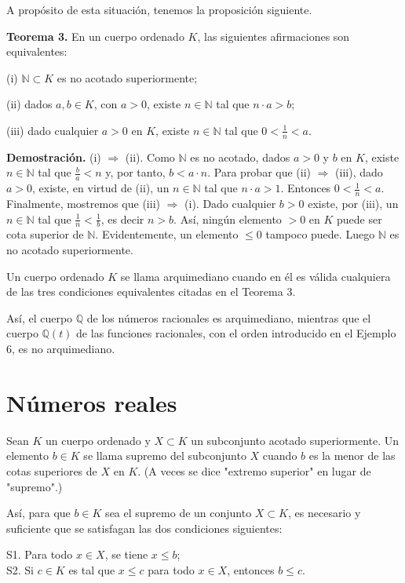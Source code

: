 \documentclass[12pt,oneside]{book}
\begin{document}
A propósito de esta situación, tenemos la proposición siguiente.

\textbf{Teorema 3.} En un cuerpo ordenado \(K\), las siguientes afirmaciones son equivalentes:

(i) \(\mathbb{N} \subset K\) es no acotado superiormente;

(ii) dados \(a, b \in K\), con \(a > 0\), existe \(n \in \mathbb{N}\) tal que \(n \cdot a > b\);

(iii) dado cualquier \(a > 0\) en \(K\), existe \(n \in \mathbb{N}\) tal que \(0 < \frac{1}{n} < a\).

\textbf{Demostración.} (i) \(\Rightarrow\) (ii). Como \(\mathbb{N}\) es no acotado, dados \(a > 0\) y \(b\) en \(K\), existe \(n \in \mathbb{N}\) tal que \(\frac{b}{a} < n\) y, por tanto, \(b < a \cdot n\). Para probar que (ii) \(\Rightarrow\) (iii), dado \(a > 0\), existe, en virtud de (ii), un \(n \in \mathbb{N}\) tal que \(n \cdot a > 1\). Entonces \(0 < \frac{1}{n} < a\). Finalmente, mostremos que (iii) \(\Rightarrow\) (i). Dado cualquier \(b > 0\) existe, por (iii), un \(n \in \mathbb{N}\) tal que \(\frac{1}{n} < \frac{1}{b}\), es decir \(n > b\). Así, ningún elemento \(> 0\) en \(K\) puede ser cota superior de \(\mathbb{N}\). Evidentemente, un elemento \(\leq 0\) tampoco puede. Luego \(\mathbb{N}\) es no acotado superiormente.

Un cuerpo ordenado \(K\) se llama arquimediano cuando en él es válida cualquiera de las tres condiciones equivalentes citadas en el Teorema 3.

Así, el cuerpo \(\mathbb{Q}\) de los números racionales es arquimediano, mientras que el cuerpo \(\mathbb{Q}(t)\) de las funciones racionales, con el orden introducido en el Ejemplo 6, es no arquimediano.

\section{Números reales}

Sean \(K\) un cuerpo ordenado y \(X \subset K\) un subconjunto acotado superiormente. Un elemento \(b \in K\) se llama supremo del subconjunto \(X\) cuando \(b\) es la menor de las cotas superiores de \(X\) en \(K\). (A veces se dice "extremo superior" en lugar de "supremo".)

Así, para que \( b \in K \) sea el supremo de un conjunto \( X \subset K \), es necesario y suficiente que se satisfagan las dos condiciones siguientes:

S1. Para todo \( x \in X \), se tiene \( x \leq b \);\\
S2. Si \( c \in K \) es tal que \( x \leq c \) para todo \( x \in X \), entonces \( b \leq c \).
\end{document}
